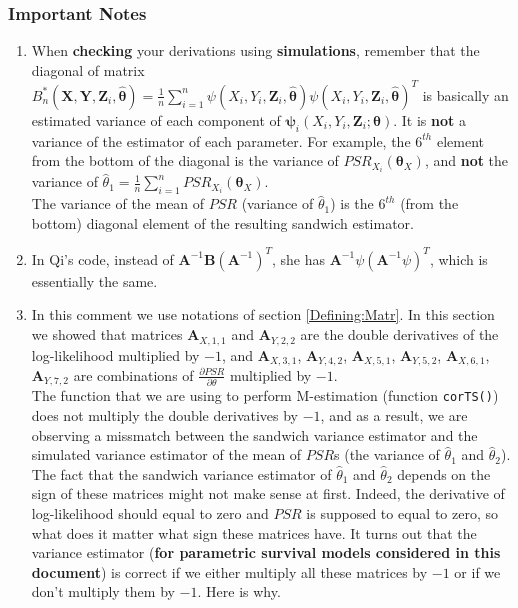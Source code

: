 \documentclass[]{article}
\begin{document}
\subsubsection{Important Notes}

\begin{enumerate}[1)]
\item
When \textbf{checking} your derivations using \textbf{simulations}, remember that the diagonal of matrix $B^*_n(\pmb{X}, \pmb{Y}, \pmb{Z}_i, \hat{\pmb{\theta}}) = \frac{1}{n} \sum_{i = 1}^{n} \psi(X_i, Y_i, \pmb{Z}_i, \hat{\pmb{\theta}}) \psi(X_i, Y_i, \pmb{Z}_i, \hat{\pmb{\theta}})^T$ is basically an estimated variance of each component of $\pmb{\psi}_i(X_i, Y_i, \pmb{Z}_i; \pmb{\theta})$. It is \textbf{not} a variance of the estimator of each parameter. For example, the $6^{th}$ element from the bottom of the diagonal is the variance of $PSR_{X_{i}}(\pmb{\theta}_X)$, and \textbf{not} the variance of $\hat{\theta}_1 = \frac{1}{n}\sum_{i=1}^{n} PSR_{X_{i}}(\pmb{\theta}_X)$.\\
The variance of the mean of $PSR$ (variance of $\hat{\theta}_1$) is the $6^{th}$ (from the bottom) diagonal element of the resulting sandwich estimator.

\item In Qi's code, instead of $\pmb{A}^{-1}\pmb{B} (\pmb{A}^{-1})^T$, she has $\pmb{A}^{-1}\psi (\pmb{A}^{-1}\psi)^T$, which is essentially the same.\\

\item In this comment we use notations of section \ref{Defining:Matr}. In this section we showed that matrices $\pmb{A}_{X,1,1}$ and $\pmb{A}_{Y,2,2}$ are the double derivatives of the log-likelihood multiplied by $-1$, and  $\pmb{A}_{X,3,1}$, $\pmb{A}_{Y, 4,2}$,  $\pmb{A}_{X,5,1}$, $\pmb{A}_{Y,5,2}$, $\pmb{A}_{X,6,1}$, $\pmb{A}_{Y, 7,2}$ are combinations of $\frac{\partial PSR}{\partial \theta}$  multiplied by $-1$.\\
The function that we are using to perform M-estimation (function \texttt{corTS()}) does not multiply the double derivatives by $-1$, and as a result, we are observing a missmatch between the sandwich variance estimator and the simulated variance estimator of the mean of $PSR$s (the variance of $\hat{\theta}_1$ and $\hat{\theta}_2$).\\
The fact that the sandwich variance estimator of $\hat{\theta}_1$ and $\hat{\theta}_2$ depends on the sign of these matrices might not make sense at first. Indeed, the derivative of log-likelihood should equal to zero and $PSR$ is supposed to equal to zero, so what does it matter what sign these matrices have. It turns out that the variance estimator (\textbf{for parametric survival models considered in this document}) is correct if we either multiply all these matrices by $-1$ or if we don't multiply them by $-1$. Here is why.\\


\end{enumerate}
\end{document}
